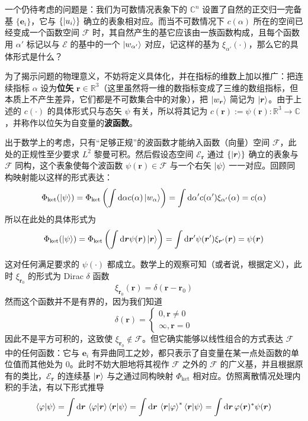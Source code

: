 \documentclass[cn,10pt,math=newtx,citestyle=gb7714-2015,bibstyle=gb7714-2015]{elegantbook}
\def\bm{\boldsymbol}
\def\bf{\textbf}
\def\ms{\mathscr}
\def\mc{\mathcal}
\def\d{\mathrm d}
\def\C{\mathbb C}
\def\R{\mathbb R}
\def\ra{\rightarrow}
\begin{document}
一个仍待考虑的问题是：我们为可数情况表象下的 $\C^n$ 设置了自然的正交归一完备基 $\{\bm e_i\}$，它与 $\{\ket{u_i}\}$ 确立的表象相对应。而当不可数情况下 $c(\alpha)$ 所在的空间已经变成一个函数空间 $\mc F$ 时，其自然产生的基它应该由一族函数构成，且每个函数用 $\alpha'$ 标记以与 $\ms E$ 的基中的一个 $\ket{w_{\alpha'}}$ 对应，记这样的基为 $\xi_{\alpha'}(\cdot)$，那么它的具体形式是什么？

为了揭示问题的物理意义，不妨将定义具体化，并在指标的维数上加以推广：把连续指标 $\alpha$ 设为\bf{位矢} $\bm r\in\R^3$（这里虽然将一维的数指标变成了三维的数组指标，但本质上不产生差异，它们都是不可数集合中的对象），把 $\ket{w_{\bm r}}$ 简记为 $\ket{\bm r}$。由于上述的 $c(\cdot)$ 的具体形式只与态矢 $\psi$ 有关，所以将其记为 $c(\bm r):=\psi(\bm r):\R^3\ra\C$，并称作以位矢为自变量的\bf{波函数}。

出于数学上的考虑，只有“足够正规”的波函数才能纳入函数（向量）空间 $\mc F$，此处的正规性至少要求 $L^2$ 黎曼可积。然后假设态空间 $\ms E_{\bm r}$ 通过 $\{\ket{\bm r}\}$ 确立的表象与 $\mc F$ 同构，这个表象使每个波函数 $\psi(\bm r)\in \mc F$ 与一个右矢 $\ket{\psi}$ 一一对应。回顾同构映射能以这样的形式表达：
\begin{equation}
   \Phi_\text{ket}(\ket{\psi})=\Phi_\text{ket}\left(\int\d\alpha c(\alpha)\ket{w_\alpha}\right)=\int\d\alpha' c(\alpha')\xi_{\alpha'}(\alpha)=c(\alpha)
\end{equation}
所以在此处的具体形式为
\begin{equation}
   \Phi_\text{ket}(\ket{\psi})=\Phi_\text{ket}\left(\int\d\bm r \psi(\bm r)\ket{\bm r}\right)=\int\d\bm r' \psi(\bm r')\xi_{\bm r'}(\bm r)=\psi(\bm r)
\end{equation}

这对任何满足要求的 $\psi(\cdot)$ 都成立。数学上的观察可知（或者说，根据定义），此时 $\xi_{\bm r_0}$ 的形式为 Dirac $\delta$ 函数
\begin{equation}
   \xi_{\bm r_0}(\bm r)=\delta(\bm r-\bm r_0)
\end{equation}
然而这个函数并不是有界的，因为我们知道
\begin{equation}
    \delta(\bm r) = \begin{cases}
        0, \bm r\ne 0\\
        \infty, \bm r=0
    \end{cases}
\end{equation}
因此不是平方可积的，这致使 $\xi_{\bm r_0}\notin\mc F$。但它确实能够以线性组合的方式表达 $\mc F$ 中的任何函数：它与 $\bm e_i$ 有异曲同工之妙，都只表示了自变量在某一点处函数的单位值而其他处为 0。此时不妨大胆地将其视作 $\mc F$ 之外的 $\mc F$ 的广义基，并且根据原有的类比，$\ms E_{\bm r}$ 的连续基 $\ket{\bm r}$ 与之通过同构映射 $\Phi_\text{ket}$ 相对应。仿照离散情况处理内积的手法，有以下形式推导
\begin{equation}
   \braket{\varphi|\psi} = \int\d\bm r\,\braket{\varphi|\bm r}\braket{\bm r|\psi}=\int\d\bm r\,\braket{\bm r|\varphi}^*\braket{\bm r|\psi}=\int\d\bm r\,\varphi(\bm r)^*\psi(\bm r)
\end{equation}
\end{document}
